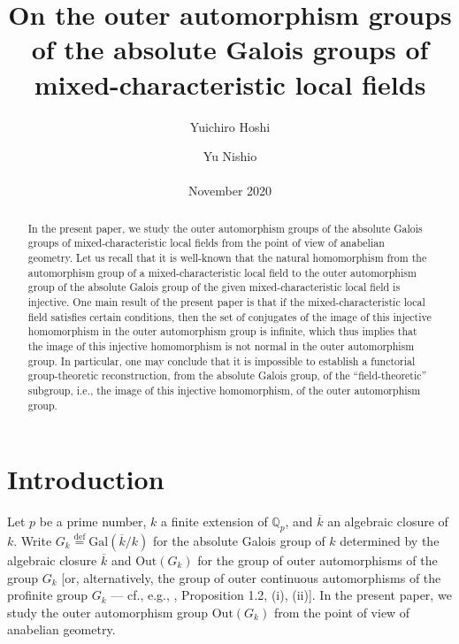 \documentclass[12pt,showkeys]{amsart}
\title[On the outer automorphism groups]{On the outer automorphism groups of the absolute Galois groups of mixed-characteristic local fields}
\author{Yuichiro Hoshi \and Yu Nishio \\ \\ November 2020}
\date{}
\theoremstyle{theorem}
\theoremstyle{definition}
\begin{document}
\maketitle

\begin{abstract}
In the present paper, we study the outer automorphism groups of the 
absolute Galois groups of mixed-characteristic local fields from the 
point of view of anabelian geometry.  Let us recall that it is 
well-known that the natural homomorphism from the automorphism group 
of a mixed-characteristic local field to the outer automorphism 
group of the absolute Galois group of the given mixed-characteristic 
local field is injective.  One main result of the present paper is 
that if the mixed-characteristic local field satisfies certain 
conditions, then the set of conjugates of the image of this injective 
homomorphism in the outer automorphism group is infinite, which thus 
implies that the image of this injective homomorphism is not normal in 
the outer automorphism group. 
In particular, one may conclude that it is impossible to establish a functorial group-theoretic reconstruction, from the absolute Galois group, 
of the ``field-theoretic'' subgroup, i.e., the image of this injective 
homomorphism, of the outer automorphism group.  
\end{abstract} 

\setcounter{section}{-1}

\section*{Introduction}
Let $p$ be a prime number, $k$ a finite extension of 
$\mathbb{Q}_p$, and $\overline{k}$ an algebraic closure 
of $k$.  Write $G_k \stackrel{\mathrm{def}}{=} \mathrm{Gal}
(\overline{k} / k)$ for the absolute Galois group of $k$ 
determined by the algebraic closure $\overline{k}$ 
and $\mathrm{Out}(G_k)$ for the group of outer 
automorphisms of the group $G_k$ [or, alternatively, the 
group of outer continuous automorphisms of the profinite 
group $G_k$ --- cf., e.g., \cite{Hoshi4}, Proposition 1.2, 
(i), (ii)].  In the present paper, we study the outer automorphism group 
$\mathrm{Out}(G_k)$ from the point of view of anabelian 
geometry.  
\end{document}
